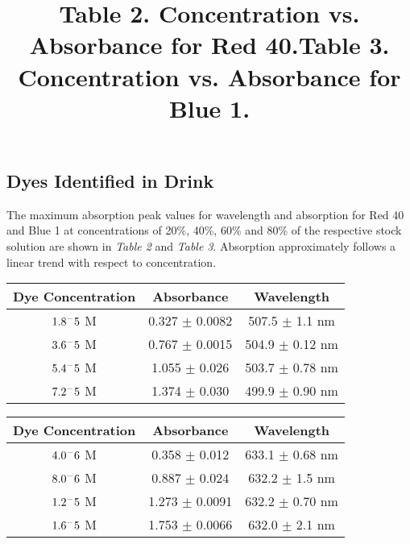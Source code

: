 \documentclass[12pt]{article}
\begin{document}
\subsection*{Dyes Identified in Drink}
The maximum absorption peak values for wavelength and absorption for  Red 40 and Blue 1 at concentrations of 20\%, 40\%, 60\% and 80\% of the respective stock solution are shown in \textit{Table 2} and \textit{Table 3}. Absorption approximately follows a linear trend with respect to concentration.\par\vspace{6pt}
\title{\textbf{Table 2.} Concentration vs. Absorbance for Red 40.}
\begin{center}
\begin{tabular}{|c|c|c|}
\hline 
Dye Concentration & Absorbance & Wavelength \\ 
\hline 
$1.8 \time 10^-5$ M & 0.327 $\pm$ 0.0082 & 507.5 $\pm$ 1.1 nm \\ 
\hline 
$3.6 \time 10^-5$ M & 0.767 $\pm$ 0.0015 & 504.9 $\pm$ 0.12 nm \\ 
\hline 
$5.4 \time 10^-5$ M & 1.055 $\pm$ 0.026 & 503.7 $\pm$ 0.78 nm\\ 
\hline 
$7.2 \time 10^-5$ M & 1.374 $\pm$ 0.030 & 499.9 $\pm$ 0.90 nm\\ 
\hline 
\end{tabular} 
\end{center}
\title{\textbf{Table 3.} Concentration vs. Absorbance for Blue 1.}
\begin{center}
\begin{tabular}{|c|c|c|}
\hline 
Dye Concentration & Absorbance & Wavelength \\ 
\hline 
$4.0 \time 10^-6$ M & 0.358 $\pm$ 0.012 & 633.1 $\pm$ 0.68 nm \\ 
\hline 
$8.0 \time 10^-6$ M & 0.887 $\pm$ 0.024 & 632.2 $\pm$ 1.5 nm \\ 
\hline 
$1.2 \time 10^-5$ M & 1.273 $\pm$ 0.0091 & 632.2 $\pm$ 0.70 nm\\ 
\hline 
$1.6 \time 10^-5$ M & 1.753 $\pm$ 0.0066 & 632.0 $\pm$ 2.1 nm\\ 
\hline 
\end{tabular} 
\end{center}
\end{document}
